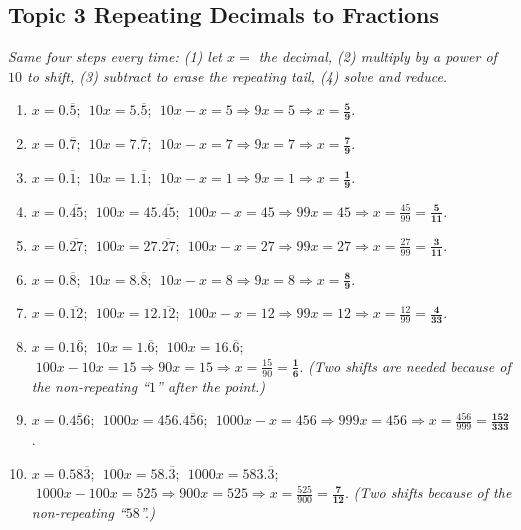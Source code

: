 \documentclass[11pt]{article}
\newcommand{\rep}[1]{\overline{#1}}
\begin{document}
\subsection*{Topic 3 \; \textbullet\; Repeating Decimals to Fractions}
{\small\itshape Same four steps every time: (1) let $x=$ the decimal, (2) multiply by a power of $10$ to shift, (3) subtract to erase the repeating tail, (4) solve and reduce.}
\begin{enumerate}[label=\textbf{\color{fangblue}\arabic*.},leftmargin=*,itemsep=7pt]
\item $x=0.\rep{5}$; $\;10x=5.\rep{5}$; $\;10x-x=5\Rightarrow 9x=5\Rightarrow x=\mathbf{\frac{5}{9}}$.
\item $x=0.\rep{7}$; $\;10x=7.\rep{7}$; $\;10x-x=7\Rightarrow 9x=7\Rightarrow x=\mathbf{\frac{7}{9}}$.
\item $x=0.\rep{1}$; $\;10x=1.\rep{1}$; $\;10x-x=1\Rightarrow 9x=1\Rightarrow x=\mathbf{\frac{1}{9}}$.
\item $x=0.\rep{45}$; $\;100x=45.\rep{45}$; $\;100x-x=45\Rightarrow 99x=45\Rightarrow x=\frac{45}{99}=\mathbf{\frac{5}{11}}$.
\item $x=0.\rep{27}$; $\;100x=27.\rep{27}$; $\;100x-x=27\Rightarrow 99x=27\Rightarrow x=\frac{27}{99}=\mathbf{\frac{3}{11}}$.
\item $x=0.\rep{8}$; $\;10x=8.\rep{8}$; $\;10x-x=8\Rightarrow 9x=8\Rightarrow x=\mathbf{\frac{8}{9}}$.
\item $x=0.\rep{12}$; $\;100x=12.\rep{12}$; $\;100x-x=12\Rightarrow 99x=12\Rightarrow x=\frac{12}{99}=\mathbf{\frac{4}{33}}$.
\item $x=0.1\rep{6}$; $\;10x=1.\rep{6}$; $\;100x=16.\rep{6}$; $\;100x-10x=15\Rightarrow 90x=15\Rightarrow x=\frac{15}{90}=\mathbf{\frac{1}{6}}$. \; {\small\itshape(Two shifts are needed because of the non-repeating ``$1$'' after the point.)}
\item $x=0.\rep{456}$; $\;1000x=456.\rep{456}$; $\;1000x-x=456\Rightarrow 999x=456\Rightarrow x=\frac{456}{999}=\mathbf{\frac{152}{333}}$.
\item $x=0.58\rep{3}$; $\;100x=58.\rep{3}$; $\;1000x=583.\rep{3}$; $\;1000x-100x=525\Rightarrow 900x=525\Rightarrow x=\frac{525}{900}=\mathbf{\frac{7}{12}}$. \; {\small\itshape(Two shifts because of the non-repeating ``$58$''.)}
\end{enumerate}

\end{document}
